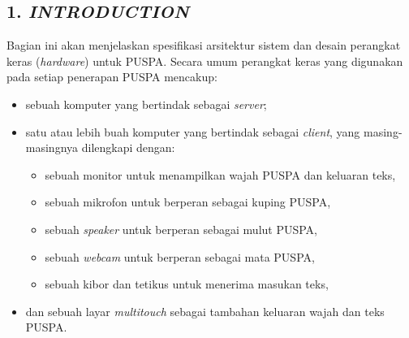 \subsection*{\textcolor{subsectioncolor}{\textsf{1. \textit{INTRODUCTION}}}}
Bagian ini akan menjelaskan spesifikasi arsitektur sistem dan desain perangkat keras (\textit{hardware}) untuk PUSPA. Secara umum perangkat keras yang digunakan pada setiap penerapan PUSPA mencakup:
\begin{itemize}
	\item sebuah komputer yang bertindak sebagai \textit{server};
	\item satu atau lebih buah komputer yang bertindak sebagai \textit{client}, yang masing-masingnya
dilengkapi dengan:
		\begin{itemize}
			\item sebuah monitor untuk menampilkan wajah PUSPA dan keluaran teks,
			\item sebuah mikrofon untuk berperan sebagai kuping PUSPA,
			\item sebuah \textit{speaker} untuk berperan sebagai mulut PUSPA,
			\item sebuah \textit{webcam} untuk berperan sebagai mata PUSPA,
			\item sebuah kibor dan tetikus untuk menerima masukan teks,
		\end{itemize}
	\item dan sebuah layar \textit{multitouch} sebagai tambahan keluaran wajah dan teks PUSPA.
\end{itemize}
